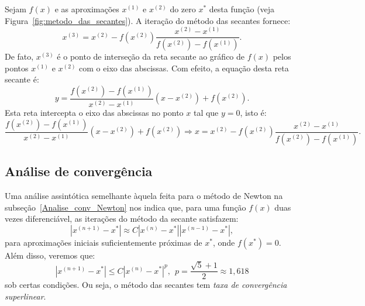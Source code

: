 Sejam $f(x)$ e as aproximações $x^{(1)}$ e $x^{(2)}$ do zero $x^*$ desta função (veja Figura~\ref{fig:metodo_das_secantes}). A iteração do método das secantes fornece:
\begin{equation*}
  x^{(3)} = x^{(2)} - f(x^{(2)})\frac{x^{(2)} - x^{(1)}}{f(x^{(2)}) - f(x^{(1)})}.
\end{equation*}
De fato, $x^{(3)}$ é o ponto de interseção da reta secante ao gráfico de $f(x)$ pelos pontos $x^{(1)}$ e $x^{(2)}$ com o eixo das abscissas. Com efeito, a equação desta reta secante é:
\begin{equation*}
  y = \frac{f(x^{(2)}) - f(x^{(1)})}{x^{(2)} - x^{(1)}}(x - x^{(2)}) + f(x^{(2)}).
\end{equation*}
Esta reta intercepta o eixo das abscissas no ponto $x$ tal que $y=0$, isto é:
\begin{equation*}
  \frac{f(x^{(2)}) - f(x^{(1)})}{x^{(2)} - x^{(1)}}(x - x^{(2)}) + f(x^{(2)}) \Rightarrow x = x^{(2)} - f(x^{(2)})\frac{x^{(2)} - x^{(1)}}{f(x^{(2)}) - f(x^{(1)})}.
\end{equation*}


\subsection{Análise de convergência}

Uma análise assintótica semelhante àquela feita para o método de Newton na subseção~\ref{Analise_conv_Newton} nos indica que, para uma função $f(x)$ duas vezes diferenciável, as iterações do método da secante satisfazem:
\begin{equation*}
  |x^{(n+1)} - x^*| \approx C |x^{(n)} - x^*||x^{(n-1)} - x^*|,
\end{equation*}
para aproximações iniciais suficientemente próximas de $x^*$, onde $f(x^*) = 0$. Além disso, veremos que:
\begin{equation*}
  |x^{(n+1)} - x^*| \leq C |x^{(n)} - x^*|^{p},~~ p=\frac{\sqrt{5}+1}{2}\approx 1,618
\end{equation*}
sob certas condições. Ou seja, o método das secantes tem \emph{taxa de convergência superlinear}.

